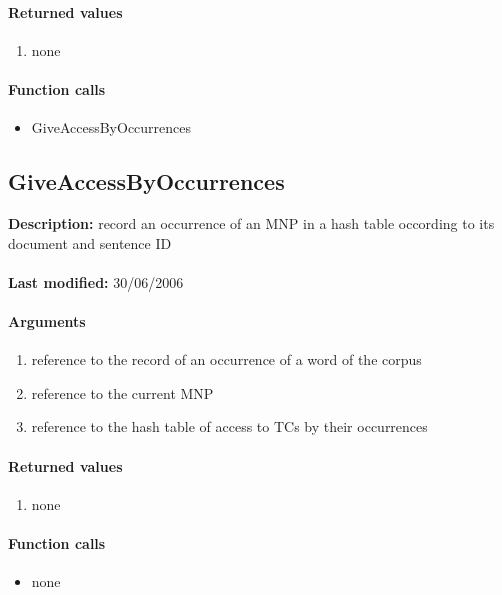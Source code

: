 \paragraph{Returned values}
\begin{enumerate}
\item none
\end{enumerate}

\paragraph{Function calls}
\begin{itemize}
\item GiveAccessByOccurrences
\end{itemize}

\subsection{GiveAccessByOccurrences}
\textbf{Description:} record an occurrence of an MNP in a hash table occording to its document and sentence ID\\
\\\textbf{Last modified:} 30/06/2006

\paragraph{Arguments}
\begin{enumerate}
\item reference to the record of an occurrence of a word of the corpus
\item reference to the current MNP
\item reference to the hash table of access to TCs by their occurrences
\end{enumerate}

\paragraph{Returned values}
\begin{enumerate}
\item none
\end{enumerate}

\paragraph{Function calls}
\begin{itemize}
\item none
\end{itemize}

